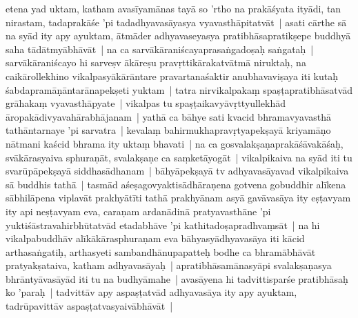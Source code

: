 \documentclass[article,12pt,a4paper]{memoir}%
\newcounter{parCount}
\begin{document}
	  \pstart \leavevmode%
	\label{thakur75-140.12}etena yad uktam, katham avasīyamānas \label{ratnakīrtinibandhāvali__36r1PF7IMRL3AMLSE72I8R6WZC0}tayā so 'rtho\label{ratnakīrtinibandhāvali__36r1PF7IMRIYIIGI4TNLZD3AB1C} na prakāśyata ityādi, tan nirastam, tadaprakāśe 'pi tadadhyavasāyasya vyavasthāpitatvāt | asati cārthe sā na syād ity apy ayuktam, ātmāder adhyavaseyasya pratibhāsapratikṣepe buddhyā saha tādātmyābhāvāt | na ca sarvākāraniścayaprasaṅgadoṣaḥ saṅgataḥ | sarvākāraniścayo hi sarveṣv ākāreṣu pravṛttikārakatvātmā niruktaḥ, na caikārollekhino vikalpasyākārāntare pravartanaśaktir anubhavaviṣaya iti kutaḥ śabdapramāṇāntarānapekṣeti yuktam | tatra nirvikalpakaṃ spaṣṭapratibhāsatvād grāhakaṃ vyavasthāpyate | vikalpas tu spaṣṭaikavyāvṛttyullekhād āropakādivyavahārabhājanam | yathā ca bāhye sati kvacid bhramavyavasthā tathāntarnaye 'pi sarvatra | kevalaṃ bahirmukhapravṛtyapekṣayā kriyamāṇo nātmani kaścid bhrama ity uktaṃ bhavati | na ca gosvalakṣaṇaprakāśāvakāśaḥ, svākārasyaiva sphuraṇāt, svalakṣaṇe ca saṃketāyogāt | vikalpikaiva na syād iti tu svarūpāpekṣayā siddhasādhanam | bāhyāpekṣayā tv adhyavasāyavad vikalpikaiva sā buddhis tathā | tasmād aśeṣagovyaktisādhāraṇena gotvena gobuddhir alīkena sābhilāpena viplavāt prakhyātīti tathā prakhyānam asyā gavāvasāya ity eṣṭavyam ity api neṣṭavyam eva, caraṇam ardanādinā pratyavasthāne 'pi yuktiśāstravahirbhūtatvād etadabhāve 'pi kathitadoṣapradhvaṃsāt | na hi vikalpabuddhāv alīkākārasphuraṇam eva bāhyasyādhyavasāya iti kācid arthasaṅgatiḥ, arthasyeti sambandhānupapatteḥ \label{ratnakīrtinibandhāvali__36r1PF7IMRGUOJ6VH79IC2IAM5I}bodhe ca bhramābhāvāt\label{ratnakīrtinibandhāvali__36r1PF7IMREQOM5KKKSKN74E0AR} pratyakṣataiva, katham adhyavasāyaḥ | apratibhāsamānasyāpi svalakṣaṇasya bhrāntyāvasāyād iti tu na budhyāmahe | avasāyena hi tadvittisparśe pratibhāsaḥ ko 'paraḥ | tadvittāv apy aspaṣṭatvād adhyavasāya ity apy ayuktam, tadrūpavittāv aspaṣṭatvasyaivābhāvāt |
	{}
	\pend%
      
\end{document}
